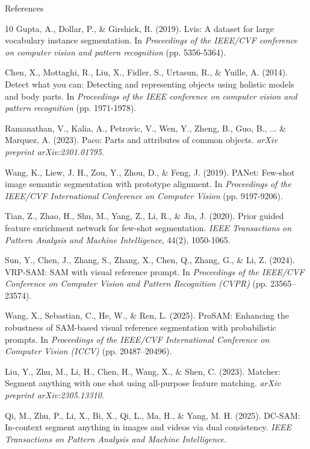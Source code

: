\documentclass[aspectratio=169, 10pt]{beamer}
\begin{document}
\begin{frame}[allowframebreaks]{References}
\begin{thebibliography}{10}
Gupta, A., Dollar, P., \& Girshick, R. (2019). Lvis: A dataset for large vocabulary instance segmentation. In \textit{Proceedings of the IEEE/CVF conference on computer vision and pattern recognition} (pp. 5356-5364).

Chen, X., Mottaghi, R., Liu, X., Fidler, S., Urtasun, R., \& Yuille, A. (2014). Detect what you can: Detecting and representing objects using holistic models and body parts. In \textit{Proceedings of the IEEE conference on computer vision and pattern recognition} (pp. 1971-1978).

Ramanathan, V., Kalia, A., Petrovic, V., Wen, Y., Zheng, B., Guo, B., ... \& Marquez, A. (2023). Paco: Parts and attributes of common objects. \textit{arXiv preprint arXiv:2301.01795}.

Wang, K., Liew, J. H., Zou, Y., Zhou, D., \& Feng, J. (2019). PANet: Few-shot image semantic segmentation with prototype alignment. In \textit{Proceedings of the IEEE/CVF International Conference on Computer Vision} (pp. 9197-9206).

Tian, Z., Zhao, H., Shu, M., Yang, Z., Li, R., \& Jia, J. (2020). Prior guided feature enrichment network for few-shot segmentation. \textit{IEEE Transactions on Pattern Analysis and Machine Intelligence}, 44(2), 1050-1065.

Sun, Y., Chen, J., Zhang, S., Zhang, X., Chen, Q., Zhang, G., \& Li, Z. (2024).
VRP-SAM: SAM with visual reference prompt.
In \textit{Proceedings of the IEEE/CVF Conference on Computer Vision and Pattern Recognition (CVPR)} (pp. 23565--23574).

Wang, X., Sebastian, C., He, W., \& Ren, L. (2025).
ProSAM: Enhancing the robustness of SAM-based visual reference segmentation with probabilistic prompts.
In \textit{Proceedings of the IEEE/CVF International Conference on Computer Vision (ICCV)} (pp. 20487--20496).

Liu, Y., Zhu, M., Li, H., Chen, H., Wang, X., \& Shen, C. (2023).
Matcher: Segment anything with one shot using all-purpose feature matching.
\textit{arXiv preprint arXiv:2305.13310}.

Qi, M., Zhu, P., Li, X., Bi, X., Qi, L., Ma, H., \& Yang, M. H. (2025).
DC-SAM: In-context segment anything in images and videos via dual consistency.
\textit{IEEE Transactions on Pattern Analysis and Machine Intelligence}.


\end{thebibliography}
\end{frame}
\end{document}
